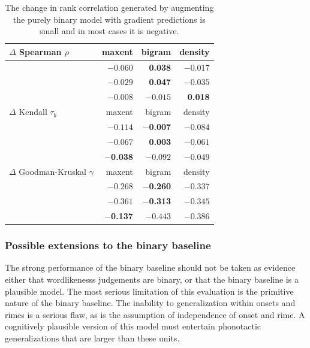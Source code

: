 \begin{table} \label{controlled}
\centering
\begin{tabular}{l r r r}
\toprule
$\Delta$ Spearman $\rho$          & maxent            & bigram            & density  \\
\midrule
\citealt{Greenberg1964}  & $-0.060$          &  \textbf{0.038} & $-0.017$ \\
\citealt{Scholes1966}    & $-0.029$          &  \textbf{0.047} & $-0.035$ \\
\citealt{Albright2003b}  & $-0.008$          & $-0.015$          & \textbf{0.018} \\
\midrule
$\Delta$ Kendall $\tau_b$         & maxent            & bigram            & density  \\
\midrule
\citealt{Greenberg1964}  & $-0.114$          & \textbf{$-$0.007} & $-0.084$ \\
\citealt{Scholes1966}    & $-0.067$          & \textbf{0.003}  & $-0.061$ \\
\citealt{Albright2003b}  & \textbf{$-$0.038} & $-0.092$          & $-0.049$ \\
\midrule
$\Delta$ Goodman-Kruskal $\gamma$ & maxent            & bigram            & density  \\
\midrule
\citealt{Greenberg1964}  & $-0.268$          & \textbf{$-$0.260} & $-0.337$ \\
\citealt{Scholes1966}    & $-0.361$          & \textbf{$-$0.313} & $-0.345$ \\
\citealt{Albright2003b}  & \textbf{$-$0.137} & $-0.443$          & $-0.386$ \\
\bottomrule
\end{tabular}
\caption{The change in rank correlation generated by augmenting the purely binary model with gradient predictions is small and in most cases it is negative.}
\end{table}

\subsubsection{Possible extensions to the binary baseline}

The strong performance of the binary baseline should not be taken as evidence either that wordlikenesss judgements are binary, or that the binary baseline is a plausible model. The most serious limitation of this evaluation is the primitive nature of the binary baseline. The inability to generalization within onsets and rimes is a serious flaw, as is the assumption of independence of onset and rime. A cognitively plausible version of this model must entertain phonotactic generalizations that are larger than these units.

